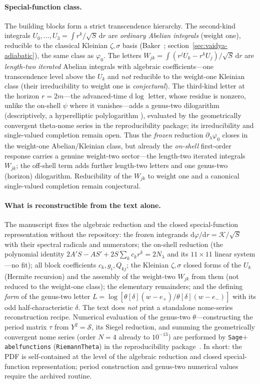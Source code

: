 \documentclass[12pt]{iopart}
\newcommand{\dd}{\mathrm{d}}
\theoremstyle{plain}
\theoremstyle{definition}
\theoremstyle{plain}
\theoremstyle{remark}
\begin{document}
\paragraph{Special-function class.} The building blocks form a strict transcendence
hierarchy. The second-kind integrals $U_0,\dots,U_3=\int r^k/\sqrt S\,\dd r$ are
\emph{ordinary Abelian integrals} (weight one), reducible to the classical Kleinian
$\zeta,\sigma$ basis (Baker~\cite{BakerAbelian1897}; section~\ref{sec:vaidya-adiabatic}),
the same class as $\varphi_0$. The letters
$W_{jk}=\int(r^jU_k-r^kU_j)/\sqrt S\,\dd r$ are \emph{length-two iterated} Abelian
integrals with algebraic coefficients---one transcendence level above the $U_k$ and
\emph{not} reducible to the weight-one Kleinian class (their irreducibility to weight one
is \emph{conjectural}). The third-kind letter at the horizon $r=2m$---the advanced-time
$\dd\log$ letter, whose residue is nonzero, unlike the on-shell $\psi$ where it
vanishes---adds a genus-two dilogarithm (descriptively, a hyperelliptic polylogarithm
\cite{BauneEtal2024,DHokerHiddingSchlotterer2025}), evaluated by the geometrically
convergent theta-nome series in the reproducibility package; its irreducibility and
single-valued completion remain open. Thus the \emph{frozen} reduction
$\partial_\lambda\varphi_0$ closes in the weight-one Abelian/Kleinian class, but already
the \emph{on-shell} first-order response carries a genuine weight-two sector---the
length-two iterated integrals $W_{jk}$; the off-shell term adds further length-two letters
and one genus-two (horizon) dilogarithm. Reducibility of the $W_{jk}$ to weight one and a
canonical single-valued completion remain conjectural.

\paragraph{What is reconstructible from the text alone.} The manuscript fixes the
algebraic reduction and the closed special-function representation without the
repository: the frozen integrands
$\dd\varphi/\dd r=\mathcal K/\sqrt S$ with their spectral radicals and numerators;
the on-shell reduction (the polynomial identity $2A'S-AS'+2S\sum_k c_kr^k=2N_\lambda$
and its $11\times11$ linear system---no fit); all block coefficients $c_k,g_i,Q_{kj}$;
the Kleinian $\zeta,\sigma$ closed forms of the $U_k$ (Hermite recursion) and the assembly
of the weight-two $W_{jk}$ from them (not reduced to the weight-one class); the elementary
remainders; and the defining \emph{form} of the genus-two letter
$L=\log[\theta[\delta](w-e_+)/\theta[\delta](w-e_-)]$ with its odd half-characteristic
$\delta$. The text does \emph{not} print a standalone nome-series reconstruction recipe.
Numerical evaluation of the genus-two $\theta$---constructing the period matrix
$\tau$ from $Y^2=\mathcal S$, its Siegel reduction, and summing the geometrically
convergent nome series (order $N{=}4$ already to $10^{-13}$) are performed by
\texttt{Sage}$+$\texttt{abelfunctions} (\texttt{RiemannTheta}) in the reproducibility
package~\cite{Rosignoli2026CodeJMP}. In short: the PDF is self-contained at the level of the
algebraic reduction and closed special-function representation; period construction and
genus-two numerical values require the archived routine.
\end{document}
